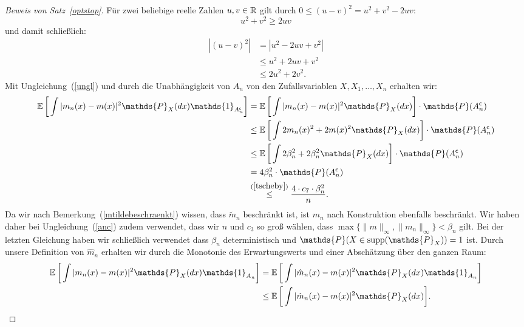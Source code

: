 \begin{proof}[Beweis von Satz~\ref{optstop}]
Für zwei beliebige reelle Zahlen $u, v \in \mathbb{R}$ gilt durch $0 \leq (u - v)^2 = u^2 + v^2 - 2uv$:
$$u^2 + v^2 \geq 2uv$$ und damit schließlich:
\begin{equation}
\label{ungl}
\begin{split}
|(u - v)^2| & = |u^2 - 2uv + v^2| \\
& \leq  u^2 + 2uv + v^2 \\
& \leq 2u^2 + 2v^2.
\end{split}
\end{equation}
Mit Ungleichung~(\ref{ungl}) und durch die Unabhängigkeit von $A_n$ von den Zufallsvariablen $X, X_1, \dots, X_n$ erhalten wir:
\begin{equation}
\label{anc}
\begin{split}
 \E \bigg[\int |m_n(x) - m(x)|^2 \mathds{P}_X(dx) \mathds{1}_{A_n^{\mathsf{c}}}\bigg] & =  \E \bigg[\int |m_n(x) - m(x)|^2 \mathds{P}_X(dx) \bigg] \cdot \mathds{P}(A_n^{\mathsf{c}}) \\
 & \leq \E \bigg[\int 2m_n(x)^2 + 2m(x)^2 \mathds{P}_X(dx)\bigg] \cdot \mathds{P}(A_n^{\mathsf{c}})\\
 & \leq \E \bigg[\int  2\beta_n^2 + 2\beta_n^2 \mathds{P}_X(dx)\bigg] \cdot \mathds{P}(A_n^{\mathsf{c}})\\
 & = 4\beta_n^2 \cdot \mathds{P}(A_n^{\mathsf{c}}) \\
 & \stackrel{(\ref{tscheby})}{\leq} \frac{4 \cdot c_7 \cdot \beta_n^2}{n}.
\end{split}
\end{equation}
Da wir nach Bemerkung~(\ref{mtildebeschraenkt}) wissen, dass $\tilde{m}_n$ beschränkt ist, ist $m_n$ nach Konstruktion ebenfalls beschränkt. Wir haben daher bei Ungleichung~(\ref{anc}) zudem verwendet, dass wir $n$ und $c_3$ so groß wählen, dass $\max\{\|m\|_{\infty}, \|m_n\|_{\infty}\} < \beta_n$ gilt. Bei der letzten Gleichung haben wir schließlich verwendet dass $\beta_n$ deterministisch und $\mathds{P}(X \in \supp(\mathds{P}_X)) = 1$ ist.
Durch unsere Definition von $\hat{m}_n$ erhalten wir durch die Monotonie des Erwartungswerts und einer Abschätzung über den ganzen Raum:
\begin{equation}
\label{an}
\begin{split}
\E \bigg[\int |m_n(x) - m(x)|^2 \mathds{P}_X(dx) \mathds{1}_{A_n}\bigg] & = \E \bigg[\int |\hat{m}_n(x) - m(x)|^2 \mathds{P}_X(dx) \mathds{1}_{A_n}\bigg] \\
& \leq \E \bigg[\int |\hat{m}_n(x) - m(x)|^2 \mathds{P}_X(dx)\bigg].
\end{split}

\end{equation}
\end{proof}
